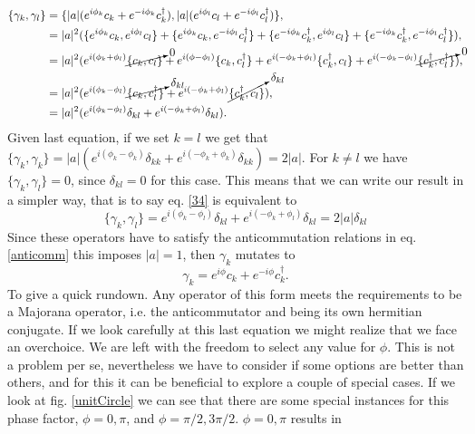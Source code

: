  \begin{equation}
    \begin{aligned}[b]
     \{\gamma_k,\gamma_l\} &= \{ |a|(e^{i\phi_k}c_k +  e^{-i\phi_k}c_k^\dagger), |a|(e^{i\phi_l}c_l +  e^{-i\phi_l}c_l^\dagger)\}, \\
     &= |a|^2(\{ e^{i\phi_k}c_k, e^{i\phi_l}c_l\} +  \{ e^{i\phi_k}c_k , e^{-i\phi_l}c_l^\dagger\} +  \{e^{-i\phi_k}c_k^\dagger, e^{i\phi_l}c_l\} +  \{e^{-i\phi_k}c_k^\dagger, e^{-i\phi_l}c_l^\dagger\}),\\
     &= |a|^2(e^{i(\phi_k+\phi_l)}\cancelto{0}{\{ c_k,c_l\}} +  e^{i(\phi-\phi_l)}\{ c_k ,c_l^\dagger\} +  e^{i(-\phi_k+\phi_l)}\{c_k^\dagger, c_l\} +  e^{i(-\phi_k-\phi_l)}\cancelto{0}{\{c_k^\dagger,c_l^\dagger\}}),\\
     &= |a|^2(e^{i(\phi_k-\phi_l)}\cancelto{\delta_{kl}}{\{ c_k ,c_l^\dagger\}} +  e^{i(-\phi_k+\phi_l)}\cancelto{\delta_{kl}}{\{c_k^\dagger, c_l\}}),\\
     &= |a|^2(e^{i(\phi_k-\phi_l)}\delta_{kl} +  e^{i(-\phi_k+\phi_l)}\delta_{kl}).
    \end{aligned}
    \label{34}
\end{equation}
Given last equation, if we set $k=l$ we get that $\{\gamma_k,\gamma_k\} = |a|(e^{i(\phi_k-\phi_k)}\delta_{kk} +  e^{i(-\phi_k+\phi_k)}\delta_{kk}) = 2|a| $. For $k \neq l$ we have $\{\gamma_k,\gamma_l\} = 0$, since $\delta_{kl} = 0$ for this case. This means that we can write our result in a simpler way, that is to say eq. \ref{34} is equivalent to 
\begin{equation*}
    \{\gamma_k,\gamma_l\} = e^{i(\phi_k-\phi_l)}\delta_{kl} +  e^{i(-\phi_k+\phi_l)}\delta_{kl} = 2|a| \delta_{kl}
\end{equation*}
Since these operators have to satisfy the anticommutation relations in eq. \ref{anticomm} this imposes $|a|=1$, then $\gamma_k$ mutates to 
 \begin{equation*}
    \gamma_k = e^{i\phi}c_k + e^{-i\phi}c_k^\dagger.
\end{equation*}
To give a quick rundown. Any operator of this form meets the requirements to be a Majorana operator, i.e. the anticommutator and being its own hermitian conjugate. If we look carefully at this last equation we might realize that we face an overchoice. We are left with the freedom to select any value for $\phi$. This is not a problem per se, nevertheless we have to consider if some options are better than others, and for this it can be beneficial to explore a couple of special cases. If we look at fig. \ref{unitCircle} we can see that there are some special instances for this phase factor, $\phi = 0,\pi$, and $\phi = \pi/2, 3\pi/2$. $\phi = 0, \pi$ results in

